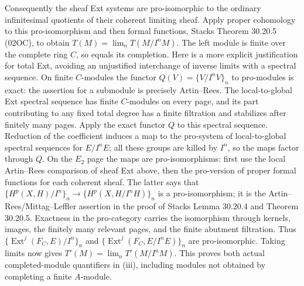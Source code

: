 Consequently the sheaf Ext systems are pro-isomorphic to the
ordinary infinitesimal quotients of their coherent limiting sheaf.
Apply proper cohomology to this pro-isomorphism and then formal
functions, Stacks Theorem 30.20.5 (02OC), to obtain
$T(M)=\lim_nT(M/I^nM)$. The left module is finite over the complete
ring $C$, so equals its completion. Here is a more explicit justification
for total Ext, avoiding an unjustified interchange of inverse limits
with a spectral sequence. On finite $C$-modules the functor
$Q(V)=\{V/I^nV\}_n$ to pro-modules is exact: the assertion for a
submodule is precisely Artin--Rees. The local-to-global Ext spectral
sequence has finite $C$-modules on every page, and its part contributing
to any fixed total degree has a finite filtration and stabilizes after
finitely many pages. Apply the exact functor $Q$ to this spectral
sequence. Reduction of the coefficient induces a map to the pro-system
of local-to-global spectral sequences for $E/I^nE$; all these groups
are killed by $I^n$, so the maps factor through $Q$.
On the $E_2$ page the maps are pro-isomorphisms: first use the local
Artin--Rees comparison of sheaf Ext above, then the pro-version of
proper formal functions for each coherent sheaf. The latter says
that $\{H^p(X,H)/I^n\}_n\to\{H^p(X,H/I^nH)\}_n$ is a
pro-isomorphism; it is the Artin--Rees/Mittag--Leffler assertion in
the proof of Stacks Lemma 30.20.4 and Theorem 30.20.5.
Exactness in the pro-category carries the isomorphism through kernels,
images, the finitely many relevant pages, and the finite abutment
filtration. Thus
$\{\operatorname{Ext}^j(F_C,E)/I^n\}_n$ and
$\{\operatorname{Ext}^j(F_C,E/I^nE)\}_n$ are pro-isomorphic.
Taking limits now gives $T'(M)=\lim_nT'(M/I^nM)$.
This proves both actual
completed-module quantifiers in (iii), including modules not obtained
by completing a finite $A$-module.

